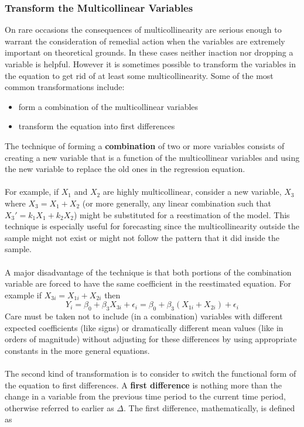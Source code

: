 \documentclass[11pt]{article}
\begin{document}
\subsubsection{Transform the Multicollinear Variables}
On rare occasions the consequences of multicollinearity are serious enough to warrant the consideration of remedial action when the variables are extremely important on theoretical grounds. In these cases neither inaction nor dropping a variable is helpful. However it is sometimes possible to transform the variables in the equation to get rid of at least some multicollinearity. Some of the most common transformations include:
\begin{itemize}
\item form a combination of the multicollinear variables
\item transform the equation into first differences
\end{itemize}
The technique of forming a \textbf{combination} of two or more variables consists of creating a new variable that is a function of the multicollinear variables and using the new variable to replace the old ones in the regression equation. \\ \\
For example, if $X_1$ and $X_2$ are highly multicollinear, consider a new variable, $X_3$ where $X_3 = X_1 + X_2$ (or more generally, any linear combination such that $X_3' = k_1X_1 + k_2X_2$) might be substituted for a reestimation of the model. This technique is especially useful for forecasting since the multicollinearity outside the sample might not exist or might not follow the pattern that it did inside the sample.\\ \\
A major disadvantage of the technique is that both portions of the combination variable are forced to have the same coefficient in the reestimated equation. For example if $X_{3i} = X_{1i} + X_{2i}$ then
\begin{equation}
Y_i = \beta_0 + \beta_3X_{3i} + \epsilon_i = \beta_0 + \beta_3 (X_{1i} + X_{2i}) + \epsilon_i \label{eg8_18}
\end{equation}
Care must be taken not to include (in a combination) variables with different expected coefficients (like signs) or dramatically different mean values (like in orders of magnitude) without adjusting for these differences by using appropriate constants in the more general equations.\\ \\
The second kind of transformation is to consider to switch the functional form of the equation to first differences. A \textbf{first difference} is nothing more than the change in a variable from the previous time period to the current time period, otherwise referred to earlier as $\Delta$. The first difference, mathematically, is defined as
\end{document}
